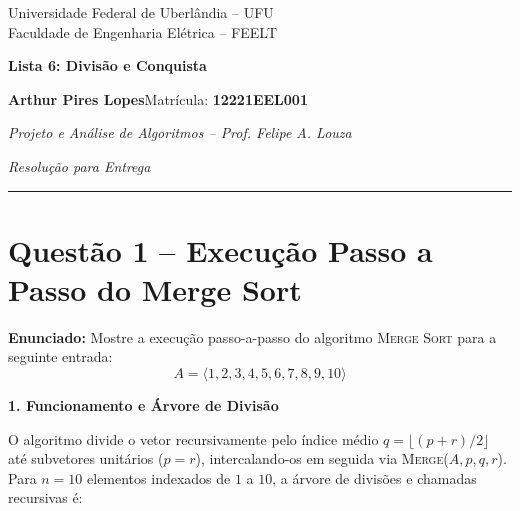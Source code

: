 \documentclass[11pt,a4paper]{article}
\newcommand{\topico}[1]{\par\medskip\textbf{\color{azul}#1}\par}
\newcommand{\questao}[2]{\section*{Questão #1 -- #2}}
\begin{document}
\begin{center}
  {\small Universidade Federal de Uberlândia -- UFU\\Faculdade de Engenharia Elétrica -- FEELT}\par
  \vspace{4pt}
  {\LARGE\bfseries\color{azul} Lista 6: Divisão e Conquista}\par
  \vspace{4pt}
  \textbf{Arthur Pires Lopes}\quad Matrícula: \textbf{12221EEL001}\par
  \textit{Projeto e Análise de Algoritmos -- Prof. Felipe A. Louza}\par
  \vspace{2pt}
  \textit{Resolução para Entrega}
\end{center}
\hrule
\vspace{6pt}

\questao{1}{Execução Passo a Passo do Merge Sort}

\textbf{Enunciado:} Mostre a execução passo-a-passo do algoritmo \textsc{Merge Sort} para a seguinte entrada:
\[
A = \langle 1, 2, 3, 4, 5, 6, 7, 8, 9, 10 \rangle
\]

\topico{1. Funcionamento e Árvore de Divisão}
O algoritmo divide o vetor recursivamente pelo índice médio $q = \lfloor (p+r)/2 \rfloor$ até subvetores unitários ($p = r$), intercalando-os em seguida via \textsc{Merge}($A, p, q, r$).
Para $n = 10$ elementos indexados de $1$ a $10$, a árvore de divisões e chamadas recursivas é:
\end{document}
